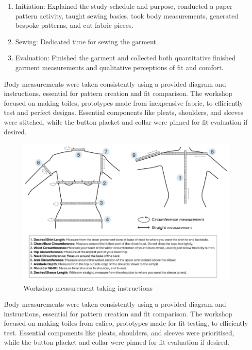 \begin{enumerate}
    \item Initiation: Explained the study schedule and purpose, conducted a paper pattern activity, taught sewing basics, took body measurements, generated bespoke patterns, and cut fabric pieces.
    \item Sewing: Dedicated time for sewing the garment.
    \item Evaluation: Finished the garment and collected both quantitative finished garment measurements and qualitative perceptions of fit and comfort.
\end{enumerate}

Body measurements were taken consistently using a provided diagram and instructions, essential for pattern creation and fit comparison. The workshop focused on making toiles, prototypes made from inexpensive fabric, to efficiently test and perfect designs. Essential components like pleats, shoulders, and sleeves were stitched, while the button placket and collar were pinned for fit evaluation if desired.
\begin{figure} [H]
    \centering
    \includegraphics[width = \textwidth]{Images/workshopmeasure.png}
    \caption{Workshop measurement taking instructions}
    \label{fig:workshopmeasure}
\end{figure}

Body measurements were taken consistently using a provided diagram and instructions, essential for pattern creation and fit comparison. The workshop focused on making toiles from calico, prototypes made for fit testing, to efficiently test. Essential components like pleats, shoulders, and sleeves were prioritised, while the button placket and collar were pinned for fit evaluation if desired.

